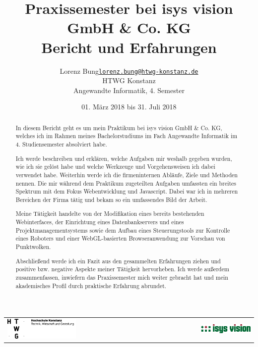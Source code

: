 \documentclass[xcolor=dvipsnames,11pt,paper=a4paper]{report}
\title{
	\Huge\textbf{Praxissemester bei isys vision GmbH \& Co. KG}\\\vspace{20pt}
	\huge{Bericht und Erfahrungen}
}
\author{
	\begin{tabular}{l l}
	Lorenz Bung &
	\href{mailto:lorenz.bung@htwg-konstanz.de}{\texttt{lorenz.bung@htwg-konstanz.de}}\\
	&HTWG Konstanz\\
	&Angewandte Informatik, 4. Semester
	\end{tabular}
}
\date{01. März 2018 bis 31. Juli 2018}
\begin{document}

\begin{titlepage}
\begin{tabular}{l r}
\includegraphics[width=0.5\textwidth]{media/htwg.png} &
\includegraphics[width=0.5\textwidth]{media/isys.png}
\end{tabular}
{\let\newpage\relax\maketitle}
\end{titlepage}

\begin{abstract}
In diesem Bericht geht es um mein Praktikum bei isys vision GmbH \& Co. KG, welches
ich im Rahmen meines Bachelorstudiums im Fach Angewandte Informatik im 4. Studiensemester
absolviert habe.

Ich werde beschreiben und erklären, welche Aufgaben mir weshalb gegeben wurden,
wie ich sie gelöst habe und welche Werkzeuge und Vorgehensweisen ich dabei verwendet
habe. Weiterhin werde ich die firmeninternen Abläufe, Ziele und Methoden nennen.
Die mir während dem Praktikum zugeteilten Aufgaben umfassten ein breites Spektrum mit dem Fokus
Webentwicklung und Javascript. Dabei war ich in mehreren Bereichen der Firma
tätig und bekam so ein umfassendes Bild der Arbeit.

Meine Tätigkeit handelte von der Modifikation eines bereits bestehenden Webinterfaces, der Einrichtung eines Datenbankservers und eines Projektmanagementsystems sowie dem Aufbau eines Steuerungstools zur Kontrolle eines Roboters und einer WebGL-basierten Browseranwendung zur Vorschau von Punktwolken.

Abschließend werde ich ein Fazit aus den gesammelten Erfahrungen ziehen und positive
bzw. negative Aspekte meiner Tätigkeit hervorheben. Ich werde außerdem zusammenfassen,
inwiefern das Praxissemester mich weiter gebracht hat und mein akademisches Profil
durch praktische Erfahrung abrundet.
\end{abstract}
\pagebreak
\end{document}
